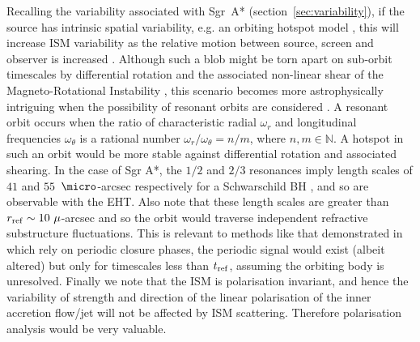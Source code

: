 Recalling the variability associated with Sgr~A* (section~\ref{sec:variability}), if the source has intrinsic spatial variability, e.g. an orbiting hotspot model \citep{Doeleman_2009}, this will increase ISM variability as the relative motion between source, screen and observer is increased \citep{Blecher_2016}. Although such a blob might be torn apart on sub-orbit timescales by differential rotation and the associated non-linear shear of the Magneto-Rotational Instability \citep[(MRI)][]{Balbus_1991}, this scenario becomes more astrophysically intriguing when the possibility of resonant orbits are considered \citep{Brink_2015}. A resonant orbit occurs when the ratio of characteristic radial $\omega_r$ and longitudinal frequencies $\omega_\theta$ is a rational number $\omega_r/\omega_\theta = n/m$, where $n,m \in \mathbb{N}$. A hotspot in such an orbit would be more stable against differential rotation and associated shearing. In the case of Sgr A*, the $1/2$ and $2/3$ resonances imply length scales of $41$ and $55$~$\micro$-arcsec respectively for a Schwarschild BH \citep{Brink_2015}, and so are observable with the EHT. Also note that these length scales are greater than $r_{\rm ref} \sim 10\ \mu$-arcsec and so the orbit would traverse independent refractive substructure fluctuations. This is relevant to methods like that demonstrated in \citet{Doeleman_2009} which rely on periodic closure phases, the periodic signal would exist (albeit altered) but only for timescales less than $t_{\rm ref}$, assuming the orbiting body is unresolved. 
Finally we note that the ISM is polarisation invariant, and hence the variability of strength and direction of the linear polarisation of the inner accretion flow/jet will not be affected by ISM scattering. Therefore polarisation analysis would be very valuable.




